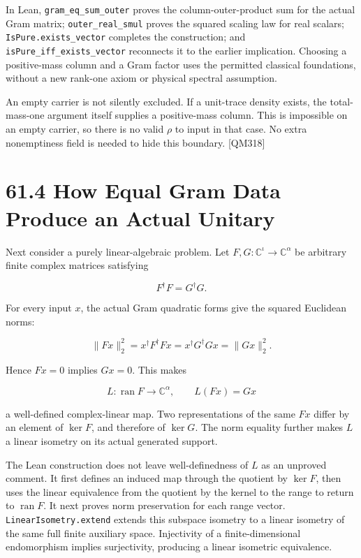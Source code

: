 \documentclass[
  11pt,
  oneside]{book}
\begin{document}
In Lean, \texttt{gram\_\allowbreak eq\_\allowbreak sum\_\allowbreak outer} proves the column-outer-product
sum for the actual Gram matrix; \texttt{outer\_\allowbreak real\_\allowbreak smul} proves the
squared scaling law for real scalars; \texttt{Is\allowbreak Pure.\allowbreak exists\_\allowbreak vector}
completes the construction; and \texttt{is\allowbreak Pure\_\allowbreak iff\_\allowbreak exists\_\allowbreak vector}
reconnects it to the earlier implication. Choosing a positive-mass
column and a Gram factor uses the permitted classical foundations,
without a new rank-one axiom or physical spectral assumption.

An empty carrier is not silently excluded. If a unit-trace density
exists, the total-mass-one argument itself supplies a positive-mass
column. This is impossible on an empty carrier, so there is no valid
\(\rho\) to input in that case. No extra nonemptiness field is needed to
hide this boundary. {[}QM318{]}

\section{61.4 How Equal Gram Data Produce an Actual Unitary}

Next consider a purely linear-algebraic problem. Let
\(F,G:\mathbb C^{\iota}\to\mathbb C^{\alpha}\) be arbitrary finite
complex matrices satisfying

\[
F^\dagger F=G^\dagger G.
\]

For every input \(x\), the actual Gram quadratic forms give the squared
Euclidean norms:

\[
\|Fx\|_2^2=x^\dagger F^\dagger Fx
=x^\dagger G^\dagger Gx=\|Gx\|_2^2.
\]

Hence \(Fx=0\) implies \(Gx=0\). This makes

\[
L:\operatorname{ran}F\longrightarrow\mathbb C^\alpha,
\qquad L(Fx)=Gx
\]

a well-defined complex-linear map. Two representations of the same
\(Fx\) differ by an element of \(\ker F\), and therefore of \(\ker G\).
The norm equality further makes \(L\) a linear isometry on its actual
generated support.

The Lean construction does not leave well-definedness of \(L\) as an
unproved comment. It first defines an induced map through the quotient
by \(\ker F\), then uses the linear equivalence from the quotient by the
kernel to the range to return to \(\operatorname{ran}F\). It next proves
norm preservation for each range vector. \texttt{Linear\allowbreak Isometry.\allowbreak extend}
extends this subspace isometry to a linear isometry of the same full
finite auxiliary space. Injectivity of a finite-dimensional endomorphism
implies surjectivity, producing a linear isometric equivalence.
\end{document}
